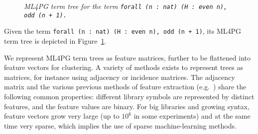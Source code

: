 \begin{figure}[t]
\centering
{}
\caption{\scriptsize{\emph{ML4PG term tree for the term \texttt{forall (n : nat) (H : even n), odd (n + 1).}}}}\label{fig:termtree}
\end{figure}  

\begin{example}\label{ex1}
 Given the term \lstinline?forall (n : nat) (H : even n), odd (n + 1)?, its ML4PG term tree is depicted in Figure~\ref{fig:termtree}.
 \end{example}

We represent ML4PG term trees as feature matrices, further to be flattened into feature vectors for clustering. %
A variety of methods exists to represent trees as matrices, for instance using
adjacency or incidence matrices. The adjacency matrix and the various previous methods of  feature
extraction (e.g.~\cite{lpar-urban,K13,UrbanSPV08}) share the following common properties: different %
library symbols are represented by distinct features, and the %
feature values are binary. %
For
big libraries and growing syntax, feature vectors grow very large (up to $10^6$ in some experiments)
and at the same time very sparse, which implies the use of sparse machine-learning methods. 




